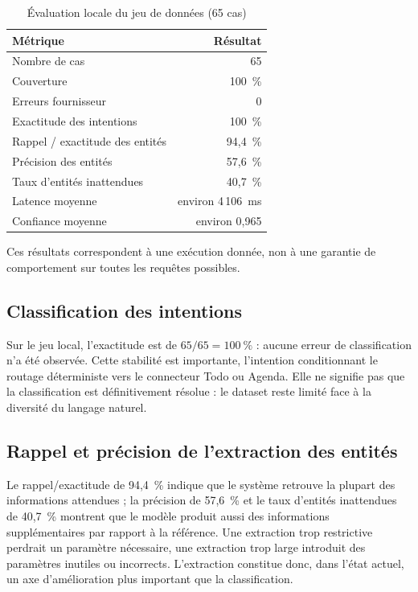 \documentclass[11pt,a4paper,openany,oneside]{report}
\begin{document}
\begin{table}[htbp]
\centering\small
\caption{Évaluation locale du jeu de données (65 cas)}\label{tab:eval-locale}
\begin{tabularx}{\textwidth}{@{}Xr@{}}
\toprule
\textbf{Métrique} & \textbf{Résultat} \\
\midrule
Nombre de cas & 65 \\
Couverture & 100~\% \\
Erreurs fournisseur & 0 \\
Exactitude des intentions & 100~\% \\
Rappel / exactitude des entités & 94,4~\% \\
Précision des entités & 57,6~\% \\
Taux d'entités inattendues & 40,7~\% \\
Latence moyenne & environ 4\,106~ms \\
Confiance moyenne & environ 0,965 \\
\bottomrule
\end{tabularx}
\end{table}

Ces résultats correspondent à une exécution donnée, non à une garantie de comportement sur toutes les requêtes possibles.

\subsection{Classification des intentions}
Sur le jeu local, l'exactitude est de $65/65 = 100~\%$ : aucune erreur de classification n'a été observée. Cette stabilité est importante, l'intention conditionnant le routage déterministe vers le connecteur Todo ou Agenda. Elle ne signifie pas que la classification est définitivement résolue : le dataset reste limité face à la diversité du langage naturel.

\subsection{Rappel et précision de l'extraction des entités}
Le rappel/exactitude de 94,4~\% indique que le système retrouve la plupart des informations attendues ; la précision de 57,6~\% et le taux d'entités inattendues de 40,7~\% montrent que le modèle produit aussi des informations supplémentaires par rapport à la référence. Une extraction trop restrictive perdrait un paramètre nécessaire, une extraction trop large introduit des paramètres inutiles ou incorrects. L'extraction constitue donc, dans l'état actuel, un axe d'amélioration plus important que la classification.
\end{document}
